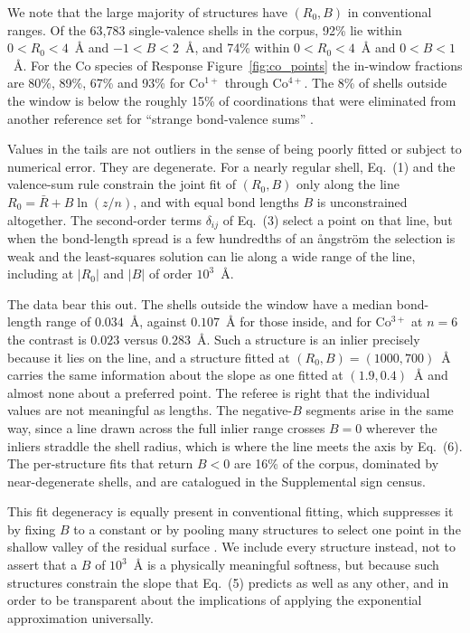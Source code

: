 \documentclass[11pt]{article}
\begin{document}
We note that the large majority of structures have $(R_0,B)$ in
conventional ranges.  Of the 63{,}783 single-valence shells in the
corpus, 92\% lie within $0<R_0<4$~\AA{} and $-1<B<2$~\AA, and 74\%
within $0<R_0<4$~\AA{} and $0<B<1$~\AA.  For the Co species of
Response Figure~\ref{fig:co_points} the in-window fractions are 80\%, 89\%,
67\% and 93\% for Co$^{1+}$ through Co$^{4+}$.  The 8\% of shells
outside the window is below the roughly 15\% of coordinations that
were eliminated from another reference set for ``strange bond-valence
sums'' \cite{Adams2001}.  

Values in the tails are not outliers in the sense of being poorly
fitted or subject to numerical error.  They are degenerate.  For a
nearly regular shell, Eq.~(1) and the valence-sum rule constrain the
joint fit of $(R_0,B)$ only along the line $R_0=\bar R+B\ln(z/n)$,
and with equal bond lengths $B$ is unconstrained altogether.  The
second-order terms $\delta_{ij}$ of Eq.~(3) select a point on that
line, but when the bond-length spread is a few hundredths of an
\aa ngstr\"om the selection is weak and the least-squares solution
can lie along a wide range of the line, including at $|R_0|$ and $|B|$ of
order $10^{3}$~\AA.  

The data bear this out.  The shells outside the
window have a median bond-length range of $0.034$~\AA, against
$0.107$~\AA{} for those inside, and for Co$^{3+}$ at $n=6$ the
contrast is $0.023$ versus $0.283$~\AA.  Such a structure is an
inlier precisely because it lies on the line, and a structure fitted
at $(R_0,B)=(1000,700)$~\AA{} carries the same information about the
slope as one fitted at $(1.9,0.4)$~\AA{} and almost none about a
preferred point.  The referee is right that the individual values
are not meaningful as lengths.  The negative-$B$ segments arise in
the same way, since a line drawn across the full inlier range crosses
$B=0$ wherever the inliers straddle the shell radius, which is where
the line meets the axis by Eq.~(6).  The per-structure fits that
return $B<0$ are 16\% of the corpus, dominated by near-degenerate
shells, and are catalogued in the Supplemental sign census.  

This fit degeneracy is equally present in conventional fitting, which
suppresses it by fixing $B$ to a constant \cite{Brown1985} or by
pooling many structures to select one point in the shallow valley of
the residual surface \cite{Gagn2015}.  We include every structure
instead, not to assert that a $B$ of $10^{3}$~\AA{} is a physically
meaningful softness, but because such structures constrain the slope
that Eq.~(5) predicts as well as any other, and in order to be
transparent about the implications of applying the exponential
approximation universally.
\end{document}
